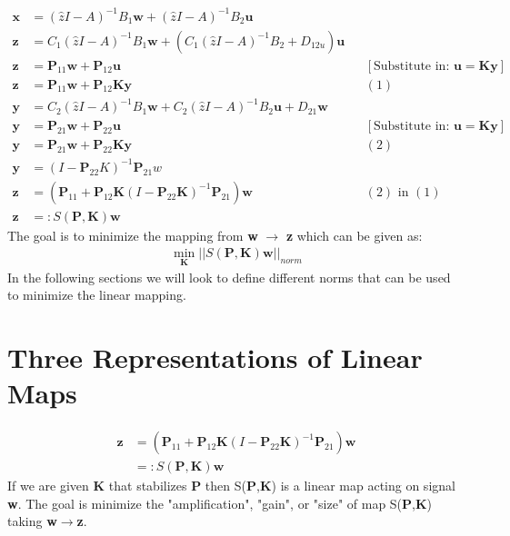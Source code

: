 \documentclass{article}[12pt]
\newcommand{\norm}[1]{\left|\left|#1\right|\right|}
\begin{document}
\begin{align*}
    \textbf{x} &= (\hat{z}I-A)^{-1}B_1\textbf{w}+(\hat{z}I-A)^{-1}B_2\textbf{u}\\
    \textbf{z} & = C_1(\hat{z}I-A)^{-1}B_1\textbf{w} + (C_1(\hat{z}I-A)^{-1}B_2 + D_{12u})\textbf{u}\\
    \textbf{z} &= \textbf{P}_{11}\textbf{w}+\textbf{P}_{12}\textbf{u} &&[\text{Substitute in: } \textbf{u}=\textbf{Ky}]\\
    \textbf{z} &= \textbf{P}_{11}\textbf{w}+\textbf{P}_{12}\textbf{Ky} && (1)\\
    \textbf{y} &= C_2(\hat{z}I-A)^{-1}B_1\textbf{w} + C_2(\hat{z}I-A)^{-1}B_2\textbf{u}+D_{21}\textbf{w}\\
    \textbf{y} &= \textbf{P}_{21}\textbf{w}+\textbf{P}_{22}\textbf{u}&&[\text{Substitute in: } \textbf{u}=\textbf{Ky}]\\ 
    \textbf{y} &= \textbf{P}_{21}\textbf{w}+\textbf{P}_{22}\textbf{Ky}  &&(2)\\
    \textbf{y} &= (I-\textbf{P}_{22}K)^{-1}\textbf{P}_{21}w \\
    \textbf{z}&=(\textbf{P}_{11}+\textbf{P}_{12}\textbf{K}(I-\textbf{P}_{22}\textbf{K})^{-1}\textbf{P}_{21})\textbf{w} && (2) \text{ in } (1)\\
    \textbf{z}&=: S(\textbf{P},\textbf{K})\textbf{w}
\end{align*}
The goal is to minimize the mapping from \textbf{w} $\xrightarrow{}$ \textbf{z} which can be given as:\\
\begin{align*}
    \min_{\textbf{K}}\norm{S(\textbf{P},\textbf{K})\textbf{w}}_{norm}
\end{align*}
In the following sections we will look to define different norms that can be used to minimize the linear mapping.
\section{Three Representations of Linear Maps}
\begin{align*}
    \textbf{z}&=(\textbf{P}_{11}+\textbf{P}_{12}\textbf{K}(I-\textbf{P}_{22}\textbf{K})^{-1}\textbf{P}_{21})\textbf{w}\\
    &=: S(\textbf{P},\textbf{K})\textbf{w}
\end{align*}
If we are given \textbf{K} that stabilizes \textbf{P} then S(\textbf{P},\textbf{K}) is a linear map acting on signal \textbf{w}. The goal is minimize the "amplification", "gain", or "size" of map S(\textbf{P},\textbf{K}) taking \textbf{w}$\xrightarrow{}$\textbf{z}.\\
\end{document}
